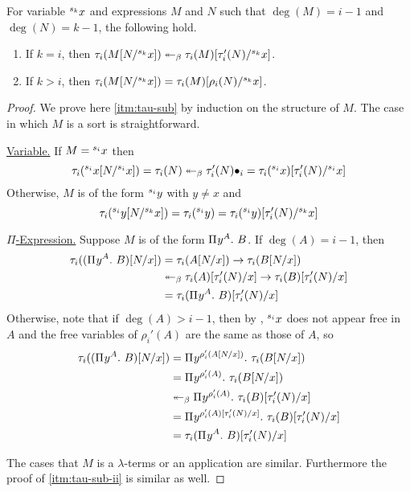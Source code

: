 \documentclass{article}
\begin{document}
\begin{lemma}\label{lem:tau-sub}
For variable ${}^{s_{k}}{x}$ and expressions $M$ and $N$ such that $\deg(M) = i - 1$ and $\deg(N) = k - 1$, the following hold.
\begin{enumerate}
    \item\label{itm:tau-sub} If $k = i$, then $\tau_i(M[N/{}^{s_{k}}{x}]) \twoheadleftarrow_\beta \tau_i(M)[\tau_i'(N)/{}^{s_{k}}{x}]$.
    \item\label{itm:tau-sub-ii} If $k > i$, then $\tau_i(M[N/{}^{s_{k}}{x}]) = \tau_i(M)[\rho_i(N)/{}^{s_{k}}{x}]$.
\end{enumerate}
\end{lemma}

\begin{proof}
We prove here \autoref{itm:tau-sub} by induction on the structure of $M$.
The case in which $M$ is a sort is straightforward.

\noindent\underline{Variable.} If $M = {}^{s_{i}}{x}$ then
\[
    \tau_i({}^{s_{i}}{x}[N/{}^{s_{i}}{x}]) =
    \tau_i(N) \twoheadleftarrow_\beta
    \tau_i'(N)\bullet_i =
    \tau_i({}^{s_{i}}{x})[\tau_i'(N)/{}^{s_{i}}{x}]
\]
Otherwise, $M$ is of the form ${}^{s_{i}}{y}$ with $y \not = x$ and
\[
    \tau_i({}^{s_{i}}{y}[N/{}^{s_{k}}{x}]) =
    \tau_i({}^{s_{i}}{y}) =
    \tau_i({}^{s_{i}}{y})[\tau_i'(N)/{}^{s_{k}}{x}]
\]

\noindent\underline{$\Pi$-Expression.} Suppose $M$ is of the form ${\Pi^{} {y}^{A}. \ {B}}$.
If $\deg(A) = i - 1$, then
\begin{align*}
\tau_i(({\Pi^{} {y}^{A}. \ {B}})[N/x]) &=
\tau_i(A[N/x]) \to \tau_i(B[N/x]) \\ &\twoheadleftarrow_\beta
\tau_i(A)[\tau_i'(N)/x] \to \tau_i(B)[\tau_i'(N)/x] \\ &=
\tau_i({\Pi^{} {y}^{A}. \ {B}})[\tau_i'(N)/x]
\end{align*}
Otherwise, note that if $\deg(A) > i - 1$, then by , ${}^{s_{i}}{x}$ does not appear free in $A$ and the free variables of $\rho_i'(A)$ are the same as those of $A$, so
\begin{align*}
\tau_i(({\Pi^{} {y}^{A}. \ {B}})[N/x]) &=
{\Pi^{} {y}^{\rho_i'(A[N/x])}. \ {\tau_i(B[N/x])}} \\ &= 
{\Pi^{} {y}^{\rho_i'(A)}. \ {\tau_i(B[N/x])}} \\ &\twoheadleftarrow_\beta
{\Pi^{} {y}^{\rho_i'(A)}. \ {\tau_i(B)[\tau_i'(N)/x]}} \\ &=
{\Pi^{} {y}^{\rho_i'(A)[\tau_i'(N)/x]}. \ {\tau_i(B)[\tau_i'(N)/x]}} \\ &=
\tau_i({\Pi^{} {y}^{A}. \ {B}})[\tau_i'(N)/x]
\end{align*}

The cases that $M$ is a $\lambda$-terms or an application are similar.
Furthermore the proof of \autoref{itm:tau-sub-ii} is similar as well.
\end{proof}
\end{document}
